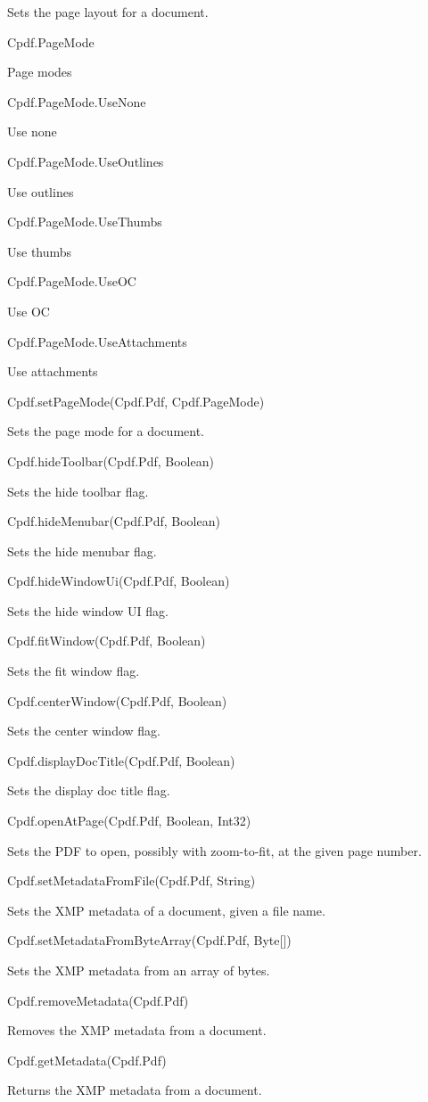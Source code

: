 Sets the page layout for a document.

Cpdf.PageMode

Page modes

Cpdf.PageMode.UseNone

Use none

Cpdf.PageMode.UseOutlines

Use outlines

Cpdf.PageMode.UseThumbs

Use thumbs

Cpdf.PageMode.UseOC

Use OC

Cpdf.PageMode.UseAttachments

Use attachments

Cpdf.setPageMode(Cpdf.Pdf, Cpdf.PageMode)

Sets the page mode for a document.

Cpdf.hideToolbar(Cpdf.Pdf, Boolean)

Sets the hide toolbar flag.

Cpdf.hideMenubar(Cpdf.Pdf, Boolean)

Sets the hide menubar flag.

Cpdf.hideWindowUi(Cpdf.Pdf, Boolean)

Sets the hide window UI flag.

Cpdf.fitWindow(Cpdf.Pdf, Boolean)

Sets the fit window flag.

Cpdf.centerWindow(Cpdf.Pdf, Boolean)

Sets the center window flag.

Cpdf.displayDocTitle(Cpdf.Pdf, Boolean)

Sets the display doc title flag.

Cpdf.openAtPage(Cpdf.Pdf, Boolean, Int32)

Sets the PDF to open, possibly with
zoom-to-fit, at the given page number.

Cpdf.setMetadataFromFile(Cpdf.Pdf, String)

Sets the XMP metadata of a
document, given a file name.

Cpdf.setMetadataFromByteArray(Cpdf.Pdf, Byte[])

Sets the XMP metadata from
an array of bytes.

Cpdf.removeMetadata(Cpdf.Pdf)

Removes the XMP metadata from a document.

Cpdf.getMetadata(Cpdf.Pdf)

Returns the XMP metadata from a document.

